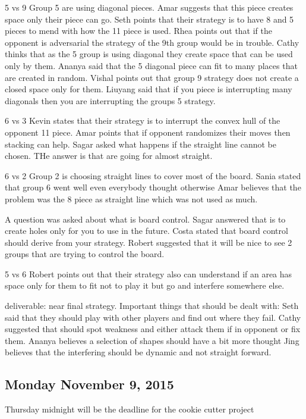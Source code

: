 5 vs 9
Group 5 are using diagonal pieces.
Amar suggests that this piece creates space only their piece can go.
Seth points that their strategy is to have 8 and 5 pieces to mend with how the 11 piece is used.
Rhea points out that if the opponent is adversarial the strategy of the 9th group would be in trouble.
Cathy thinks that as the 5 group is using diagonal they create space that can be used only by them.
Ananya said that the 5 diagonal piece can fit to many places that are created in random.
Vishal points out that group 9 strategy does not create a closed space only for them.
Liuyang  said that if you piece is interrupting many diagonals then you are interrupting the groups 5 strategy.


6 vs 3
Kevin states that their strategy is to interrupt the convex hull of the opponent 11 piece.
Amar points that if opponent randomizes their moves then stacking can help.
Sagar asked what happens if the straight line cannot be chosen. THe answer is that are going for almost straight.


6 vs 2
Group 2 is choosing straight lines to cover most of the board.
Sania stated that group 6 went well even everybody thought otherwise
Amar believes that the problem was the 8 piece as straight line which was not used as much.

A question was asked about what is board control.
Sagar answered that is to create holes only for you to use in the future.
Costa stated that board control should derive from your strategy.
Robert suggested that it will be nice to see 2 groups that are trying to control the board.


5 vs 6
Robert points out that their strategy also can understand if an area has space only for them to fit not to play  it but go and interfere somewhere else.



deliverable: near final strategy.
Important things that should be dealt with:
Seth said that they should play with other players and find out where they fail.
Cathy suggested that should spot weakness and either attack them if in opponent or fix them.
Ananya believes a selection of shapes should have a bit more thought
Jing believes that the interfering should be dynamic and not straight forward.
\subsection{Monday November 9, 2015}
Thursday midnight will be the deadline for the cookie cutter project


